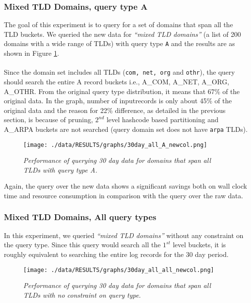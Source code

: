 \documentclass[11pt,a4paper]{article}
\begin{document}
\subsubsection{Mixed TLD Domains, query type A}
The goal of this experiment is to query for a set of domains that span all the TLD buckets. We queried the new data for \textit{``mixed TLD domains''} (a list of 200 domains with a wide range of TLDs) with query type \texttt{A} and the results are as shown in Figure \ref{allafigure}.
\\\\
Since the domain set includes all TLDs (\texttt{com, net, org} and \texttt{othr}), the query should search the entire A record buckets i.e., A\_COM, A\_NET, A\_ORG, A\_OTHR. From the original query type distribution, it means that 67\% of the original data. In the graph, number of inputrecords is only about 45\% of the original data and the reason for 22\% difference, as detailed in the previous section, is because of pruning, $2^{nd}$ level hashcode based partitioning and A\_ARPA buckets are not searched (query domain set does not have \texttt{arpa} TLDs).  

\begin{figure}[H] 
\centering
\texttt{[image: ./data/RESULTS/graphs/30day\_all\_A\_newcol.png]}
\caption {\textit{Performance of querying 30 day data for domains that span all TLDs with query type A.}}
\label{allafigure}
\end{figure}

\noindent
Again, the query over the new data shows a significant savings both on wall clock time and resource consumption in comparison with the query over the raw data.

\subsubsection{Mixed TLD Domains, All query types}
In this experiment, we queried \textit{``mixed TLD domains''} without any constraint on the query type. Since this query would search all the $1^{st}$ level buckets, it is roughly equivalent to searching the entire log records for the 30 day period.

\begin{figure}[H] 
\centering
\texttt{[image: ./data/RESULTS/graphs/30day\_all\_all\_newcol.png]}
\caption {\textit{Performance of querying 30 day data for domains that span all TLDs with no constraint on query type.}}
\end{figure}
\end{document}
